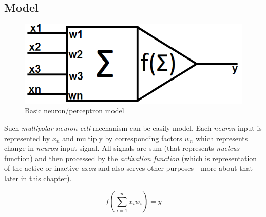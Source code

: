 \newpage
\subsection{Model}

\begin{figure}[!h]
    \centering
    \includegraphics[scale=0.5]{Media/Neuron.png}
    \caption{Basic neuron/perceptron model}
    \label{fig:NeuronModel}
\end{figure}

Such \textit{multipolar neuron cell} mechanism can be easily model. Each \textit{neuron} input is represented by $x_n$ and multiply by corresponding factors $w_n$ which represents change in \textit{neuron} input signal. All signals are sum (that represents \textit{nucleus} function) and then processed by the \textit{activation function} (which is representation of the active or inactive \textit{axon} and also serves other purposes - more about that later in this chapter).

\begin{mycapequ}[!ht]
    $$f\left(\sum\limits_{i=1}^n x_iw_i\right) = y$$
    \caption{Basic neuron/perceptron model}
    \label{formula:neuron}
\end{mycapequ}